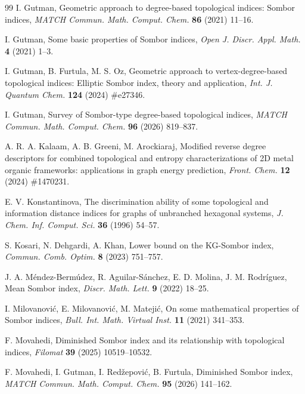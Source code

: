 \documentclass[a5paper, 10pt]{article}
\theoremstyle{plain}
\theoremstyle{remark}
\theoremstyle{definition}
\begin{document}
\begin{thebibliography}{99}
   I. Gutman, Geometric approach to degree-based
  topological indices: Sombor indices, \textit{MATCH Commun. Math. Comput.
  Chem.\/} \textbf{86} (2021) 11--16.

   I. Gutman, Some basic properties of
  Sombor indices, \textit{Open J. Discr. Appl. Math.\/} \textbf{4} (2021)
  1--3.

   I. Gutman, B. Furtula, M. S. Oz,
  Geometric approach to vertex-degree-based topological indices: Elliptic
  Sombor index, theory and application, \textit{Int. J. Quantum Chem.\/}
  \textbf{124} (2024) \#e27346.

   I. Gutman, Survey of Sombor-type
  degree-based topological indices, \textit{MATCH Commun. Math. Comput.
  Chem.\/} \textbf{96} (2026) 819--837.

   A. R. A. Kalaam, A. B. Greeni, M.
  Arockiaraj, Modified reverse degree descriptors for combined topological
  and entropy characterizations of 2D metal organic frameworks:
  applications in graph energy prediction, \textit{Front. Chem.\/}
  \textbf{12} (2024) \#1470231.

   E. V. Konstantinova, The
  discrimination ability of some topological and information distance indices
  for graphs of unbranched hexagonal systems, \textit{J. Chem. Inf. Comput.
  Sci.\/} \textbf{36} (1996) 54--57.

   S. Kosari, N. Dehgardi, A. Khan,
  Lower bound on the KG-Sombor index, \textit{Commun. Comb. Optim.\/}
  \textbf{8} (2023) 751--757.

   J. A.
  Méndez-Bermúdez, R. Aguilar-Sánchez, E. D. Molina, J. M. Rodríguez, Mean
  Sombor index, \textit{Discr. Math. Lett.\/} \textbf{9} (2022) 18--25.

   I. Milovanović, E.
  Milovanović, M. Matejić, On some mathematical properties of Sombor
  indices, \textit{Bull. Int. Math. Virtual Inst.\/} \textbf{11} (2021)
  341--353.

   F. Movahedi, Diminished Sombor index and its
  relationship with topological indices, \textit{Filomat\/} \textbf{39}
  (2025) 10519--10532.

   F. Movahedi, I. Gutman, I.
  Redžepović, B. Furtula, Diminished Sombor index, \textit{MATCH Commun.
  Math. Comput. Chem.\/} \textbf{95} (2026) 141--162.


\end{thebibliography}
\end{document}
